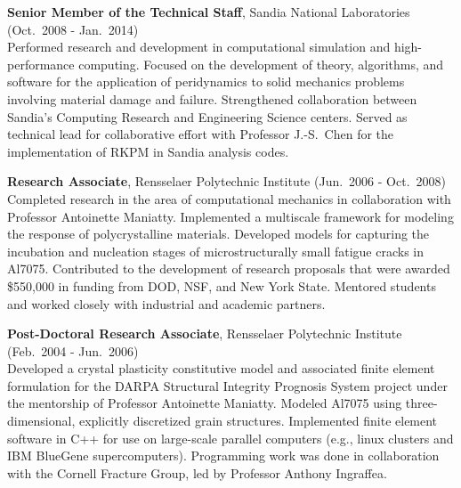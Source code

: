 \newpage
\pagestyle{fancy}
\cfoot{}
\setlength{\headheight}{\myheadheight}
\setlength{\topmargin}{\mytopmargin}

\begin{minipage}{\minipagewidth}
\textbf{Senior Member of the Technical Staff}, Sandia National Laboratories (Oct.~2008 - Jan.~2014) \\ 
%
Performed research and development in computational simulation and high-performance computing.  Focused on the development of theory, algorithms, and software for the application of peridynamics to solid mechanics problems involving material damage and failure.  Strengthened collaboration between Sandia's Computing Research and Engineering Science centers.  Served as technical lead for collaborative effort with Professor J.-S.~Chen for the implementation of RKPM in Sandia analysis codes.
\end{minipage}\vspace{\parskip}

\begin{minipage}{\minipagewidth}
\textbf{Research Associate}, Rensselaer Polytechnic Institute (Jun.~2006 - Oct.~2008) \\ 
%
Completed research in the area of computational mechanics in collaboration with Professor Antoinette Maniatty.  Implemented a multiscale framework for modeling the response of polycrystalline materials.  Developed models for capturing the incubation and nucleation stages of microstructurally small fatigue cracks in Al7075.  Contributed to the development of research proposals that were awarded \$550,000 in funding from DOD, NSF, and New York State.  Mentored students and worked closely with industrial and academic partners.
\end{minipage}\vspace{\parskip}

\begin{minipage}{\minipagewidth}
\textbf{Post-Doctoral Research Associate}, Rensselaer Polytechnic Institute (Feb.~2004 - Jun.~2006) \\ 
%
Developed a crystal plasticity constitutive model and associated finite element formulation for the DARPA Structural Integrity Prognosis System project under the mentorship of Professor Antoinette Maniatty.  Modeled Al7075 using three-dimensional, explicitly discretized grain structures.  Implemented finite element software in C++ for use on large-scale parallel computers (e.g., linux clusters and IBM BlueGene supercomputers).  Programming work was done in collaboration with the Cornell Fracture Group, led by Professor Anthony Ingraffea.
\end{minipage}\vspace{\parskip}

